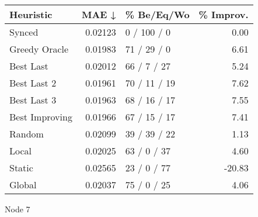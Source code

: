 \begin{tabular}{lrlr}
\toprule
\textbf{Heuristic} & \textbf{MAE ↓} & \textbf{\% Be/Eq/Wo} & \textbf{\% Improv.} \\
\midrule
            Synced &        0.02123 &          0 / 100 / 0 &                0.00 \\
     Greedy Oracle &        0.01983 &          71 / 29 / 0 &                6.61 \\
         Best Last &        0.02012 &          66 / 7 / 27 &                5.24 \\
       Best Last 2 &        0.01961 &         70 / 11 / 19 &                7.62 \\
       Best Last 3 &        0.01963 &         68 / 16 / 17 &                7.55 \\
    Best Improving &        0.01966 &         67 / 15 / 17 &                7.41 \\
            Random &        0.02099 &         39 / 39 / 22 &                1.13 \\
             Local &        0.02025 &          63 / 0 / 37 &                4.60 \\
            Static &        0.02565 &          23 / 0 / 77 &              -20.83 \\
            Global &        0.02037 &          75 / 0 / 25 &                4.06 \\
\bottomrule
\end{tabular}
\caption{Node 7}
\label{tab:iid_lr01_le2_bs4_7}
